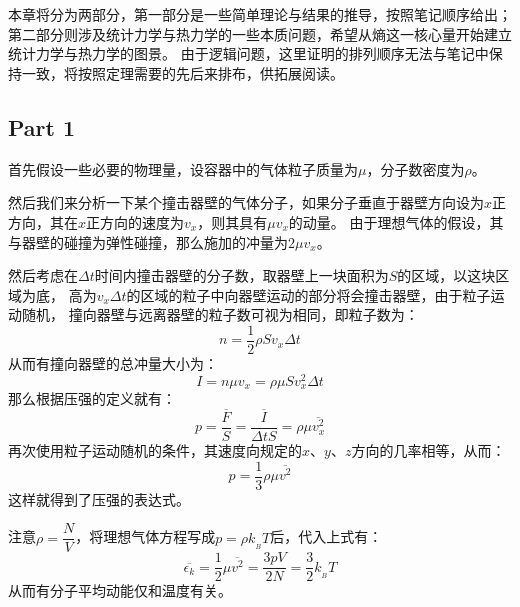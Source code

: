 %
    \chapter[热力学]{}
        本章将分为两部分，第一部分是一些简单理论与结果的推导，按照笔记顺序给出；
        第二部分则涉及统计力学与热力学的一些本质问题，希望从熵这一核心量开始建立统计力学与热力学的图景。
        由于逻辑问题，这里证明的排列顺序无法与笔记中保持一致，将按照定理需要的先后来排布，供拓展阅读。
        \section{Part 1}
        \begin{prove}
            首先假设一些必要的物理量，设容器中的气体粒子质量为$\mu$，分子数密度为$\rho$。

            然后我们来分析一下某个撞击器壁的气体分子，如果分子垂直于器壁方向设为$x$正方向，其在$x$正方向的速度为$v_x$，则其具有$\mu v_x$的动量。
            由于理想气体的假设，其与器壁的碰撞为弹性碰撞，那么施加的冲量为$2\mu v_x$。

            然后考虑在$\Delta t$时间内撞击器壁的分子数，取器壁上一块面积为$S$的区域，以这块区域为底，
            高为$v_x \Delta t$的区域的粒子中向器壁运动的部分将会撞击器壁，由于粒子运动随机，
            撞向器壁与远离器壁的粒子数可视为相同，即粒子数为：
            \begin{equation}
                n = \frac{1}{2} \rho S v_x \Delta t
                \nonumber
            \end{equation}
            从而有撞向器壁的总冲量大小为：
            \begin{equation}
                I = n \mu v_x = \rho \mu S v_{x}^{2} \Delta t
                \nonumber
            \end{equation}
            那么根据压强的定义就有：
            \begin{equation}
                p = \frac{\overline{F}}{S} = \frac{\overline{I}}{\Delta tS} = \rho \mu \overline{v_{x}^{2}}
                \nonumber
            \end{equation}                                                                      
            再次使用粒子运动随机的条件，其速度向规定的$x$、$y$、$z$方向的几率相等，从而：
            \begin{equation}
                p = \frac{1}{3}\rho \mu \overline{v^{2}}
            \end{equation}          
            这样就得到了压强的表达式。

            注意$\rho = \dfrac{N}{V}$，将理想气体方程写成$p = \rho k_{_B}T$后，代入上式有：
            \begin{equation}
                \overline{\epsilon_k} = \frac{1}{2}\mu \overline{v^{2}}  = \frac{3pV}{2N} = \frac{3}{2} k_{_B}T  
            \end{equation}
            从而有分子平均动能仅和温度有关。
        \end{prove}
